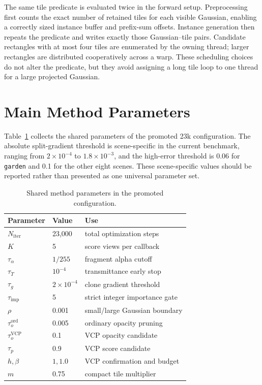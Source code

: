 The same tile predicate is evaluated twice in the forward setup. Preprocessing first counts the exact number of retained tiles for each visible Gaussian, enabling a correctly sized instance buffer and prefix-sum offsets. Instance generation then repeats the predicate and writes exactly those Gaussian--tile pairs. Candidate rectangles with at most four tiles are enumerated by the owning thread; larger rectangles are distributed cooperatively across a warp. These scheduling choices do not alter the predicate, but they avoid assigning a long tile loop to one thread for a large projected Gaussian.

\section{Main Method Parameters}

Table~\ref{tab:method-parameters} collects the shared parameters of the promoted 23k configuration. The absolute split-gradient threshold is scene-specific in the current benchmark, ranging from $2\times10^{-4}$ to $1.8\times10^{-3}$, and the high-error threshold is 0.06 for \texttt{garden} and 0.1 for the other eight scenes. These scene-specific values should be reported rather than presented as one universal parameter set.

\begin{table}[H]
\centering
\caption{Shared method parameters in the promoted configuration.}
\label{tab:method-parameters}
\begin{tabular}{lll}
\toprule
Parameter & Value & Use \\
\midrule
$N_{\mathrm{iter}}$ & 23,000 & total optimization steps \\
$K$ & 5 & score views per callback \\
$\tau_\alpha$ & $1/255$ & fragment alpha cutoff \\
$\tau_T$ & $10^{-4}$ & transmittance early stop \\
$\tau_g$ & $2\times10^{-4}$ & clone gradient threshold \\
$\tau_{\mathrm{imp}}$ & 5 & strict integer importance gate \\
$\rho$ & 0.001 & small/large Gaussian boundary \\
$\tau_o^{\mathrm{ord}}$ & 0.005 & ordinary opacity pruning \\
$\tau_o^{\mathrm{VCP}}$ & 0.1 & VCP opacity candidate \\
$\tau_p$ & 0.9 & VCP score candidate \\
$h,\beta$ & $1,1.0$ & VCP confirmation and budget \\
$m$ & 0.75 & compact tile multiplier \\
\bottomrule
\end{tabular}
\end{table}

